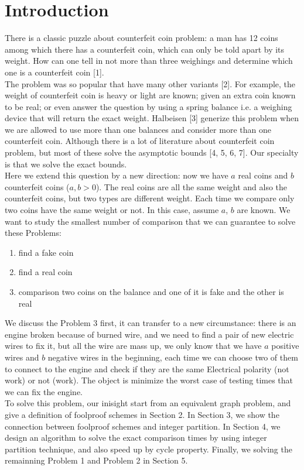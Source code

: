 
\section{Introduction}

There is a classic puzzle about counterfeit coin problem: a man has 12 coins among which there has a counterfeit coin, which can only be told apart by its weight. How can one tell in not more than three weighings and determine which one is a counterfeit coin [1].  \\


The problem was so popular that have many other variants [2]. For example, the weight of counterfeit coin is heavy or light are known; given an extra coin known to be real; or even answer the question by using a spring balance i.e. a weighing device that will return the exact weight. Halbeisen [3] generize this problem when we are allowed to use more than one balances and consider more than one counterfeit coin. 
Although there is a lot of literature about counterfeit coin problem, but most of these solve the asymptotic bounds [4, 5, 6, 7]. 
Our specialty is that we solve the exact bounds. \\



Here we extend this question by a new direction: now we have $a$ real coins and $b$ counterfeit coins ($ a, b > 0$). The real coins are all the same weight and also the counterfeit coins, but two  types are different weight. Each time we compare only two coins have the same weight or not. In this case, assume $a$, $b$ are known. We want to study the smallest number of comparison that we can guarantee to solve these Problems: \\
  \begin{enumerate}
\item find a fake coin 
\item find a real coin 
\item comparison two coins on the balance and one of it is fake and the other is real  \\
  \end{enumerate}


We discuss the Problem 3 first, it can transfer to a new circumstance:  there is an engine broken because of burned wire, and we need to find a pair of new electric wires to fix it, but all the wire are mass up, we only know that we have $a$ positive wires and $b$ negative wires in the beginning, each time we can choose two of them to connect to the engine and check if they are the same Electrical polarity (not work) or not (work). The object is minimize the worst case of testing times that we can fix the engine.  \\

To solve this problem, our inisight start from an equivalent graph problem, and give a definition of foolproof schemes in Section 2. In Section 3, we show the connection between foolproof schemes and  integer partition. In Section 4, we design an algorithm to solve the exact comparison times by using integer partition technique, and also speed up by cycle property. Finally, we solving the remainning Problem 1 and Problem 2 in Section 5.  




